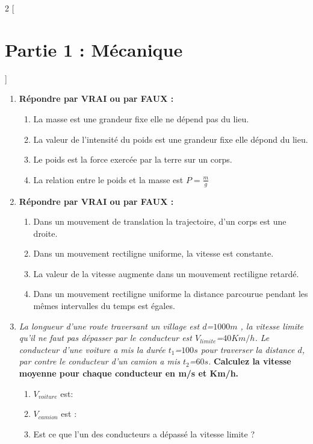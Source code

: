 \documentclass[12pt]{article}
\begin{document}
\vspace{-1cm}
\begin{multicols}{2}
    [
	\section*{Partie 1 : Mécanique }
    ]

\begin{enumerate}

	\item \textbf{Répondre par VRAI ou par FAUX :} 
		\begin{enumerate}
			\item La masse est une grandeur fixe elle ne
				dépend pas du lieu. \dotfill
			\item La valeur de l’intensité du poids est une
 grandeur fixe elle dépond du lieu. \dotfill
\item Le poids est la force exercée par la terre
 sur un corps. \dotfill
\item La relation entre le poids et la masse est $P = \frac{m}{g}$ \dotfill
		\end{enumerate}
	\item \textbf{Répondre par VRAI ou par FAUX :} 
		\begin{enumerate}
			\item Dans un mouvement de translation la  trajectoire, d’un corps est une droite. \dotfill
\item Dans un mouvement rectiligne uniforme, la vitesse est constante.\dotfill
\item  La valeur de la vitesse augmente dans un
 mouvement rectiligne retardé. \dotfill
\item Dans un mouvement rectiligne uniforme
 la distance parcourue pendant les mêmes
 intervalles du temps est égales.\dotfill
		\end{enumerate}

		\item \emph{La longueur d’une route traversant un village est $d$=$1000m$ , la vitesse limite qu’il ne faut pas
		dépasser par le conducteur est $V_{limite}$=$40Km/h$.
Le conducteur d’une voiture a mis la durée $t_1$=$100s$
pour traverser la distance $d$, par contre le conducteur d’un camion a mis $t_2$=$60s$. }  \textbf{ Calculez la vitesse moyenne pour chaque
conducteur en m/s et Km/h.}
\begin{enumerate}
	\item $V_{voiture}$ est: \dotfill
	\item $V_{camion}$ est : \dotfill
	\item Est ce que l’un des conducteurs a dépassé la
vitesse limite ?\dotfill
\end{enumerate}


\end{enumerate}
\end{multicols}
\end{document}
